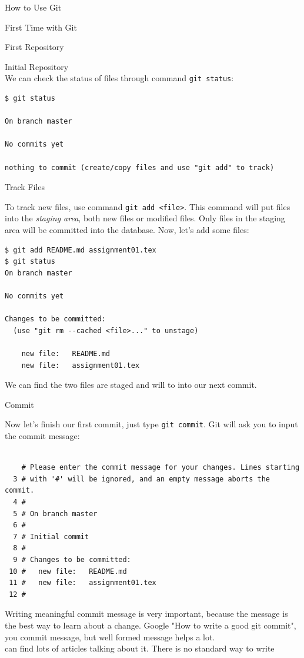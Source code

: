 \documentclass[10pt, a4papaer]{article}
\begin{document}
\begin{section}{How to Use Git}
\begin{subsection}{First Time with Git}
\begin{subsubsection}{First Repository}
\begin{paragraph}{Initial Repository\\}
We can check the status of files through command \verb|git status|:
\begin{lstlisting}
$ git status

On branch master

No commits yet

nothing to commit (create/copy files and use "git add" to track)
\end{lstlisting}
\end{paragraph}

\begin{paragraph}{Track Files\\}
    
To track new files, use command \verb|git add <file>|.
This command will put files into the \textit{staging area}, both new files or
modified files. Only files in the staging area will be committed into the database.
Now, let's add some files:

\begin{lstlisting}
$ git add README.md assignment01.tex
$ git status
On branch master

No commits yet

Changes to be committed:
  (use "git rm --cached <file>..." to unstage)

	new file:   README.md
	new file:   assignment01.tex
\end{lstlisting}

We can find the two files are staged and will to into our next commit.
\end{paragraph}

\begin{paragraph}{Commit\\}
    
Now let's finish our first commit, just type \verb|git commit|.
Git will ask you to input the commit message:

\begin{lstlisting}

    # Please enter the commit message for your changes. Lines starting
  3 # with '#' will be ignored, and an empty message aborts the commit.
  4 #
  5 # On branch master
  6 #
  7 # Initial commit
  8 #
  9 # Changes to be committed:
 10 #   new file:   README.md
 11 #   new file:   assignment01.tex
 12 #
\end{lstlisting}

Writing meaningful commit message is very important, because the message is the
best way to learn about a change. Google "How to write a good git commit", you 
commit message, but well formed message helps a lot.\\
can find lots of articles talking about it. There is no standard way to write
\end{paragraph}


\end{subsubsection}
\end{subsection}
\end{section}
\end{document}

